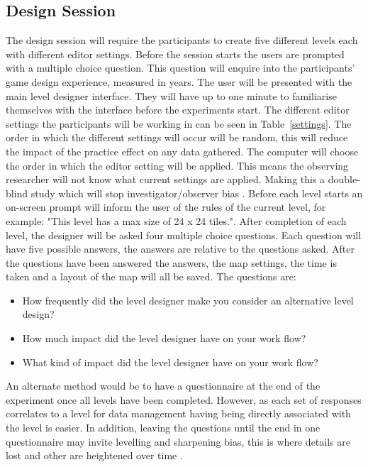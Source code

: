 \documentclass[journal]{IEEEtran}
\begin{document}
\subsection{Design Session}
The design session will require the participants to create five different levels each with different editor settings. Before the session starts the users are prompted with a multiple choice question. This question will enquire into the participants' game design experience, measured in years. The user will be presented with the main level designer interface. They will have up to one minute to familiarise themselves with the interface before the experiments start. The different editor settings the participants will be working in can be seen in Table~\ref{settings}. The order in which the different settings will occur will be random, this will reduce the impact of the practice effect on any data gathered. The computer will choose the order in which the editor setting will be applied. This means the observing researcher will not know what current settings are applied.  Making this a double-blind study which will stop investigator/observer bias \cite{phillips1999double}. Before each level starts an on-screen prompt will inform the user of the rules of the current level, for example: "This level has a max size of 24 x 24 tiles.". After completion of each level, the designer will be asked four multiple choice questions.  Each question will have five possible answers, the answers are relative to the questions asked. After the questions have been answered the answers, the map settings, the time is taken and a layout of the map will all be saved.
 The questions are:
\begin{itemize}
    \item How frequently did the level designer make you consider an alternative level design?
    
    \item How much impact did the level designer have on your work flow?

    \item What kind of impact did the level designer have on your work flow?
\end{itemize}
An alternate method would be to have a questionnaire at the end of the experiment once all levels have been completed. However, as each set of responses correlates to a level for data management having being directly associated with the level is easier. In addition, leaving the questions until the end in one questionnaire may invite levelling and sharpening bias, this is where details are lost and other are heightened over time \cite{koriat2000toward}.
\end{document}

